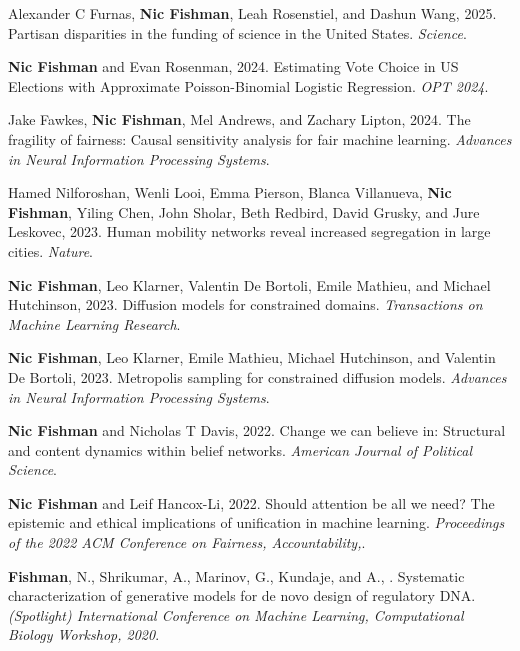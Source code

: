 \begin{cvparagraph}


\begin{addmargin}[2em]{0em}

Alexander C Furnas, \textbf{Nic Fishman}, Leah Rosenstiel, and Dashun Wang, 2025. Partisan disparities in the funding of science in the United States. \textit{Science}.

\textbf{Nic Fishman} and Evan Rosenman, 2024. Estimating Vote Choice in US Elections with Approximate Poisson-Binomial Logistic Regression. \textit{OPT 2024}.

Jake Fawkes, \textbf{Nic Fishman}, Mel Andrews, and Zachary Lipton, 2024. The fragility of fairness: Causal sensitivity analysis for fair machine learning. \textit{Advances in Neural Information Processing Systems}.

Hamed Nilforoshan, Wenli Looi, Emma Pierson, Blanca Villanueva, \textbf{Nic Fishman}, Yiling Chen, John Sholar, Beth Redbird, David Grusky, and Jure Leskovec, 2023. Human mobility networks reveal increased segregation in large cities. \textit{Nature}.

\textbf{Nic Fishman}, Leo Klarner, Valentin De Bortoli, Emile Mathieu, and Michael Hutchinson, 2023. Diffusion models for constrained domains. \textit{Transactions on Machine Learning Research}.

\textbf{Nic Fishman}, Leo Klarner, Emile Mathieu, Michael Hutchinson, and Valentin De Bortoli, 2023. Metropolis sampling for constrained diffusion models. \textit{Advances in Neural Information Processing Systems}.

\textbf{Nic Fishman} and Nicholas T Davis, 2022. Change we can believe in: Structural and content dynamics within belief networks. \textit{American Journal of Political Science}.

\textbf{Nic Fishman} and Leif Hancox-Li, 2022. Should attention be all we need? The epistemic and ethical implications of unification in machine learning. \textit{Proceedings of the 2022 ACM Conference on Fairness, Accountability,}.

\textbf{Fishman}, N., Shrikumar, A., Marinov, G., Kundaje, and A., . Systematic characterization of generative models for de novo design of regulatory DNA. \textit{(Spotlight) International Conference on Machine Learning, Computational Biology Workshop, 2020}.


\end{addmargin}
\end{cvparagraph}
